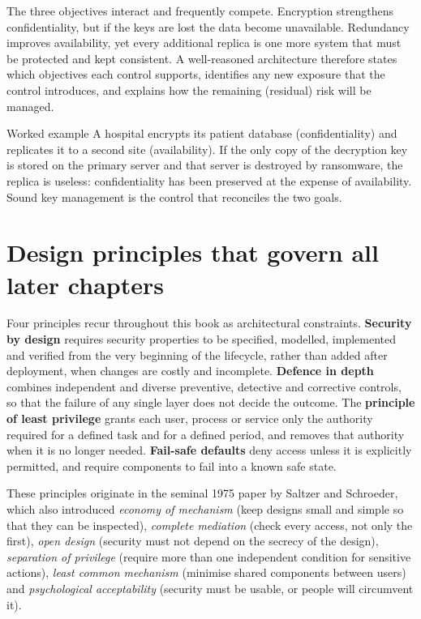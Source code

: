 \documentclass[11pt,openany]{book}
\begin{document}
The three objectives interact and frequently compete. Encryption strengthens confidentiality, but if the keys are lost the data become unavailable. Redundancy improves availability, yet every additional replica is one more system that must be protected and kept consistent. A well-reasoned architecture therefore states which objectives each control supports, identifies any new exposure that the control introduces, and explains how the remaining (residual) risk will be managed.

\begin{examplebox}{Worked example}
A hospital encrypts its patient database (confidentiality) and replicates it to a second site (availability). If the only copy of the decryption key is stored on the primary server and that server is destroyed by ransomware, the replica is useless: confidentiality has been preserved at the expense of availability. Sound key management is the control that reconciles the two goals.
\end{examplebox}

\section{Design principles that govern all later chapters}\label{sec:1.3}
Four principles recur throughout this book as architectural constraints. \textbf{Security by design} requires security properties to be specified, modelled, implemented and verified from the very beginning of the lifecycle, rather than added after deployment, when changes are costly and incomplete. \textbf{Defence in depth} combines independent and diverse preventive, detective and corrective controls, so that the failure of any single layer does not decide the outcome. The \textbf{principle of least privilege} grants each user, process or service only the authority required for a defined task and for a defined period, and removes that authority when it is no longer needed. \textbf{Fail-safe defaults} deny access unless it is explicitly permitted, and require components to fail into a known safe state.

These principles originate in the seminal 1975 paper by Saltzer and Schroeder, which also introduced \emph{economy of mechanism} (keep designs small and simple so that they can be inspected), \emph{complete mediation} (check every access, not only the first), \emph{open design} (security must not depend on the secrecy of the design), \emph{separation of privilege} (require more than one independent condition for sensitive actions), \emph{least common mechanism} (minimise shared components between users) and \emph{psychological acceptability} (security must be usable, or people will circumvent it).
\end{document}

